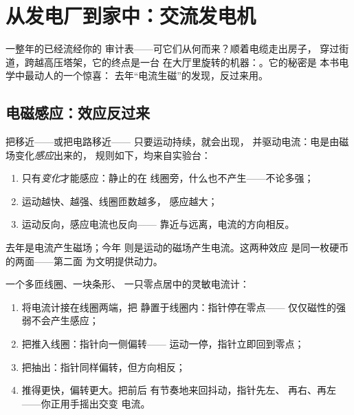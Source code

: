 \chapter{从发电厂到家中：交流发电机}\label{ch:g9:alternator}

一整年的已经流经你的
审计表——可它们从何而来？顺着电缆走出房子，
穿过街道，跨越高压塔架，它的终点是一台
在大厅里旋转的机器：。它的秘密是
本书电学中最动人的一个惊喜：
去年“电流生磁”的发现，反过来用。

\section{电磁感应：效应反过来}

\begin{proposition}[电磁感应]\label{prop:g9:alternator:induction}
把移近——或把电路移近——
只要运动持续，就会出现，
并驱动电流：电是由磁场变化\emph{感应}出来的，
规则如下，均来自实验台：
\begin{enumerate}
  \item 只有\emph{变化}才能感应：静止的在
        线圈旁，什么也不产生——不论多强；
  \item 运动越快、越强、线圈匝数越多，
        感应越大；
  \item 运动反向，感应电流也反向——
        靠近与远离，电流的方向相反。
\end{enumerate}
去年是电流产生磁场；今年
则是运动的磁场产生电流。这两种效应
是同一枚硬币的两面——第二面
为文明提供动力。
\end{proposition}

\begin{method}[实验台上的感应]\label{met:g9:alternator:bench}
一个多匝线圈、一块条形、
一只零点居中的灵敏电流计：
\begin{enumerate}
  \item 将电流计接在线圈两端，把
        静置于线圈内：指针停在零点——
        仅仅磁性的强弱不会产生感应；
  \item 把推入线圈：指针向一侧偏转——
        运动一停，指针立即回到零点；
  \item 把抽出：指针同样偏转，但方向相反；
  \item 推得更快，偏转更大。把前后
        有节奏地来回抖动，指针先左、
        再右、再左——你正用手摇出交变
        电流。
\end{enumerate}
\end{method}

